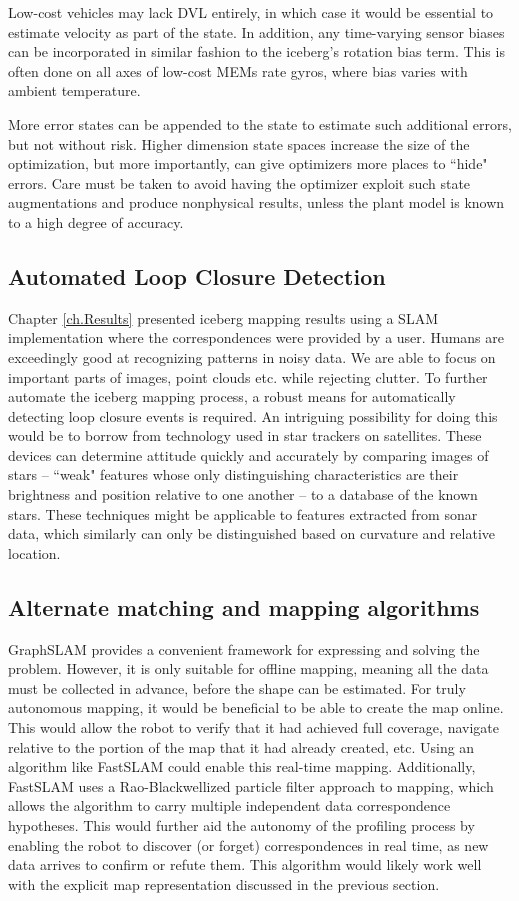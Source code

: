 Low-cost vehicles may lack DVL entirely, in which case it would be essential to estimate velocity as part of the state. In addition, any time-varying sensor biases can be incorporated in similar fashion to the iceberg's rotation bias term. This is often done on all axes of low-cost MEMs rate gyros, where bias varies with ambient temperature. 

More error states can be appended to the state to estimate such additional errors, but not without risk. Higher dimension state spaces increase the size of the optimization, but more importantly, can give optimizers more places to ``hide" errors. Care must be taken to avoid having the optimizer exploit such state augmentations and produce nonphysical results, unless the plant model is known to a high degree of accuracy.

\subsection{Automated Loop Closure Detection}
Chapter \ref{ch.Results} presented iceberg mapping results using a SLAM implementation where the correspondences were provided by a user. Humans are exceedingly good at recognizing patterns in noisy data. We are able to focus on important parts of images, point clouds etc. while rejecting clutter. To further automate the iceberg mapping process, a robust means for automatically detecting loop closure events is required. An intriguing possibility for doing this would be to borrow from technology used in star trackers on satellites. These devices can determine attitude quickly and accurately by comparing images of stars -- ``weak" features whose only distinguishing characteristics are their brightness and position relative to one another -- to a database of the known stars. These techniques might be applicable to features extracted from sonar data, which similarly can only be distinguished based on curvature and relative location. 

\subsection{Alternate matching and mapping algorithms}

GraphSLAM provides a convenient framework for expressing and solving the problem. However, it is only suitable for offline mapping, meaning all the data must be collected in advance, before the shape can be estimated. For truly autonomous mapping, it would be beneficial to be able to create the map online. This would allow the robot to verify that it had achieved full coverage, navigate relative to the portion of the map that it had already created, etc. Using an algorithm like FastSLAM \cite{Montemerlo2002} could enable this real-time mapping. Additionally, FastSLAM uses a Rao-Blackwellized particle filter approach to mapping, which allows the algorithm to carry multiple independent data correspondence hypotheses. This would further aid the autonomy of the profiling process by enabling the robot to discover (or forget) correspondences in real time, as new data arrives to confirm or refute them. This algorithm would likely work well with the explicit map representation discussed in the previous section.

